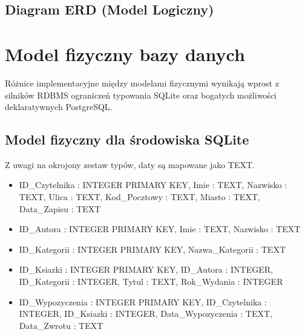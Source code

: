 \documentclass[letterpaper,10pt,english]{sphinxmanual}
\begin{document}
\subsection{Diagram ERD (Model Logiczny)}
\label{\detokenize{rozdzial_3/index:diagram-erd-model-logiczny}}
\noindent{}


\section{Model fizyczny bazy danych}
\label{\detokenize{rozdzial_3/index:model-fizyczny-bazy-danych}}
\sphinxAtStartPar
Różnice implementacyjne między modelami fizycznymi wynikają wprost z silników RDBMS \textendash{} ograniczeń typowania SQLite oraz bogatych możliwości deklaratywnych PostgreSQL.


\subsection{Model fizyczny dla środowiska SQLite}
\label{\detokenize{rozdzial_3/index:model-fizyczny-dla-srodowiska-sqlite}}
\sphinxAtStartPar
Z uwagi na okrojony zestaw typów, daty są mapowane jako TEXT.
\begin{itemize}
\item {} 
\sphinxAtStartPar
{} ID\_Czytelnika : INTEGER PRIMARY KEY, Imie : TEXT, Nazwisko : TEXT, Ulica : TEXT, Kod\_Pocztowy : TEXT, Miasto : TEXT, Data\_Zapisu : TEXT

\item {} 
\sphinxAtStartPar
{} ID\_Autora : INTEGER PRIMARY KEY, Imie : TEXT, Nazwisko : TEXT

\item {} 
\sphinxAtStartPar
{} ID\_Kategorii : INTEGER PRIMARY KEY, Nazwa\_Kategorii : TEXT

\item {} 
\sphinxAtStartPar
{} ID\_Ksiazki : INTEGER PRIMARY KEY, ID\_Autora : INTEGER, ID\_Kategorii : INTEGER, Tytul : TEXT, Rok\_Wydania : INTEGER

\item {} 
\sphinxAtStartPar
{} ID\_Wypozyczenia : INTEGER PRIMARY KEY, ID\_Czytelnika : INTEGER, ID\_Ksiazki : INTEGER, Data\_Wypozyczenia : TEXT, Data\_Zwrotu : TEXT

\end{itemize}
\end{document}
